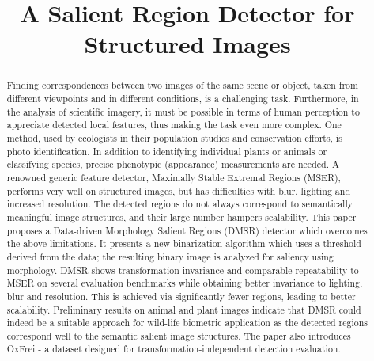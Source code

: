 \documentclass[conference,compsoc]{IEEEtran}
\begin{document}
%
\title{A Salient Region Detector for Structured Images}


\author{
}

\maketitle

\begin{abstract}
Finding correspondences between two images of the same scene or object, taken from different viewpoints and in different conditions, is a challenging task. Furthermore, in the analysis of scientific imagery, it must be possible in terms of human perception to appreciate detected local features, thus making the task even more complex. One method, used by ecologists in their population studies and conservation efforts, is photo identification. In addition to identifying individual plants or animals or classifying species, precise phenotypic (appearance) measurements are needed. A renowned generic feature detector, Maximally Stable Extremal Regions (MSER), performs very well on structured images, but has difficulties with blur, lighting and increased resolution. The detected regions do not always correspond to semantically meaningful image structures, and their large number hampers scalability. This paper proposes a Data-driven Morphology Salient Regions (DMSR) detector which overcomes the above limitations. It presents a new binarization algorithm which uses a threshold derived from the data; the resulting binary image is analyzed for saliency using morphology. DMSR shows transformation invariance and comparable repeatability to MSER on several evaluation benchmarks while obtaining better invariance to lighting, blur and resolution. This is achieved via significantly fewer regions, leading to better scalability. Preliminary results on animal and plant images indicate that DMSR could indeed be a suitable approach for wild-life biometric application as the detected regions correspond well to the semantic salient image structures. The paper also introduces OxFrei - a dataset designed for transformation-independent detection evaluation. 

\end{abstract}
\end{document}
